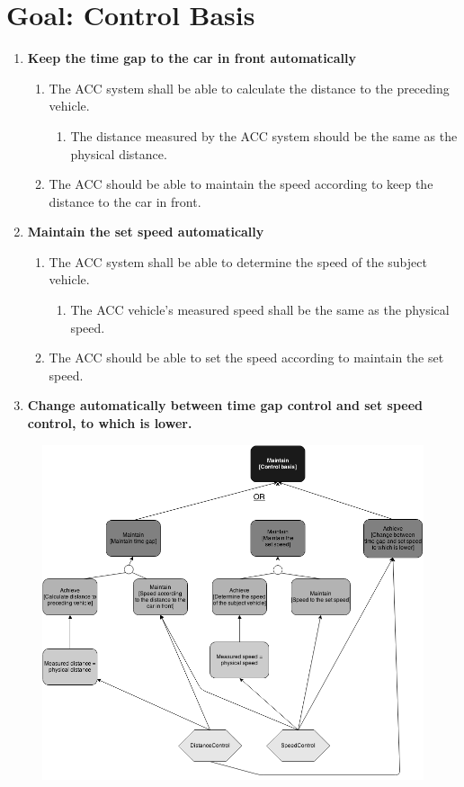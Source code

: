 \section{Goal: Control Basis}
	\begin{enumerate}
		\item {\bf Keep the time gap to the car in front automatically}
			\begin{enumerate}[label*=\arabic*.]
				\item The ACC system shall be able to calculate the distance to 
				the preceding vehicle.
					\begin{enumerate}[label*=\arabic*.]
						\item The distance measured by the ACC system should be the same 
						as the physical distance.
					\end{enumerate}
				\item The ACC should be able to maintain the speed according to keep the
				distance to the car in front.
			\end{enumerate}
		\item {\bf Maintain the set speed automatically}
			\begin{enumerate}[label*=\arabic*.]
				\item The ACC system shall be able to determine the speed of the
				subject vehicle.
					\begin{enumerate}[label*=\arabic*.]
						\item The ACC vehicle’s measured speed shall be the same
						as the physical speed.
					\end{enumerate}
				\item The ACC should be able to set the speed according to maintain the 
				set speed.
			\end{enumerate}
		\item {\bf Change automatically between time gap control and set speed control, 
		to which is lower.}
	\end{enumerate}

	\begin{figure}[H]
		\includegraphics[width=\textwidth]{pics/ControlBasis.png}
	\end{figure}

